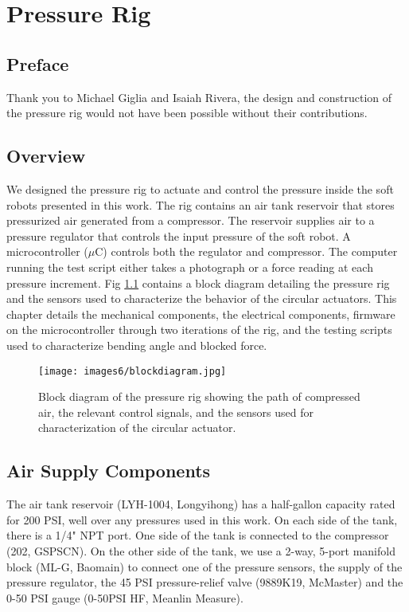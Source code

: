 \chapter{Pressure Rig}

\section*{Preface}

Thank you to Michael Giglia and Isaiah Rivera, the design and construction of the pressure rig would not have been possible without their contributions. 

\section{Overview}

We designed the pressure rig to actuate and control the pressure inside the soft robots presented in this work. The rig contains an air tank reservoir that stores pressurized air generated from a compressor. The reservoir supplies air to a pressure regulator that controls the input pressure of the soft robot. A microcontroller ($\mu$C) controls both the regulator and compressor. The computer running the test script either takes a photograph or a force reading at each pressure increment. Fig \ref{fig:blockdiagram} contains a block diagram detailing the pressure rig and the sensors used to characterize the behavior of the circular actuators. This chapter details the mechanical components, the electrical components, firmware on the microcontroller through two iterations of the rig, and the testing scripts used to characterize bending angle and blocked force. 

\begin{figure}[ht]
    \centering
    \texttt{[image: images6/blockdiagram.jpg]}
    \caption{Block diagram of the pressure rig showing the path of compressed air, the relevant control signals, and the sensors used for characterization of the circular actuator.}
    \label{fig:blockdiagram}
\end{figure}

\section{Air Supply Components}

The air tank reservoir (LYH-1004, Longyihong) has a half-gallon capacity rated for 200 PSI, well over any pressures used in this work. On each side of the tank, there is a 1/4" NPT port. One side of the tank is connected to the compressor (202, GSPSCN). On the other side of the tank, we use a 2-way, 5-port manifold block (ML-G, Baomain) to connect one of the pressure sensors, the supply of the pressure regulator, the 45 PSI pressure-relief valve (9889K19, McMaster) and the 0-50 PSI gauge (0-50PSI HF, Meanlin Measure). 


